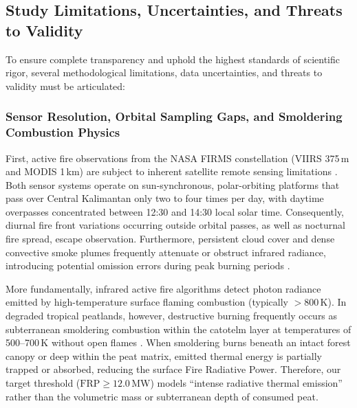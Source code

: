 \subsection{Study Limitations, Uncertainties, and Threats to Validity}
\label{subsec:disc_limitations}

To ensure complete transparency and uphold the highest standards of scientific rigor, several methodological limitations, data uncertainties, and threats to validity must be articulated:

\subsubsection{Sensor Resolution, Orbital Sampling Gaps, and Smoldering Combustion Physics}
First, active fire observations from the NASA FIRMS constellation (VIIRS 375\,m and MODIS 1\,km) are subject to inherent satellite remote sensing limitations \citep{Schroeder2021RSE, Giglio2020RSE}. Both sensor systems operate on sun-synchronous, polar-orbiting platforms that pass over Central Kalimantan only two to four times per day, with daytime overpasses concentrated between 12:30 and 14:30 local solar time. Consequently, diurnal fire front variations occurring outside orbital passes, as well as nocturnal fire spread, escape observation. Furthermore, persistent cloud cover and dense convective smoke plumes frequently attenuate or obstruct infrared radiance, introducing potential omission errors during peak burning periods \citep{Giglio2020RSE}.

More fundamentally, infrared active fire algorithms detect photon radiance emitted by high-temperature surface flaming combustion (typically $>800$\,K). In degraded tropical peatlands, however, destructive burning frequently occurs as subterranean smoldering combustion within the catotelm layer at temperatures of 500--700\,K without open flames \citep{Usup2004Tropics, Wooster2018NatGeosci, Vetrita2020RemoteSensing}. When smoldering burns beneath an intact forest canopy or deep within the peat matrix, emitted thermal energy is partially trapped or absorbed, reducing the surface Fire Radiative Power. Therefore, our target threshold ($\text{FRP} \ge 12.0$\,MW) models ``intense radiative thermal emission'' rather than the volumetric mass or subterranean depth of consumed peat.


